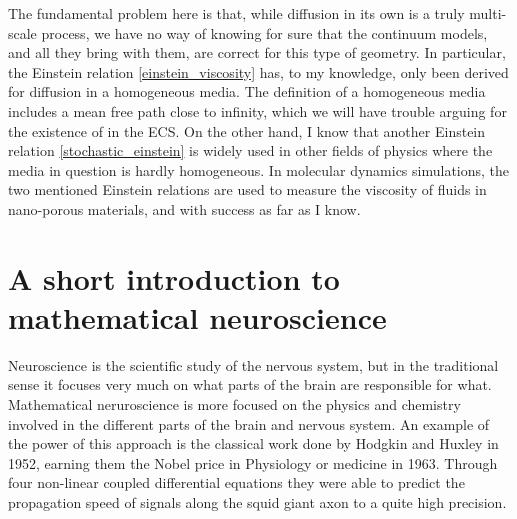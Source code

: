 The fundamental problem here is that, while diffusion in its own is a truly multi-scale process, we have no way of knowing for sure that the continuum models, and all they bring with them, are correct for this type of geometry. 
In particular, the Einstein relation \ref{einstein_viscosity} has, to my knowledge, only been derived for diffusion in a homogeneous media. 
The definition of a homogeneous media includes a mean free path close to infinity, which we will have trouble arguing for the existence of in the ECS. 
On the other hand, I know that another Einstein relation \ref{stochastic_einstein} is widely used  in other fields of physics where the media in question is hardly homogeneous. 
In molecular dynamics simulations, the two mentioned Einstein relations are used to measure the viscosity of fluids in nano-porous materials, and with success as far as I know.

\section{A short introduction to mathematical neuroscience}

Neuroscience is the scientific study of the nervous system, but in the traditional sense it focuses very much on what parts of the brain are responsible for what. 
Mathematical neruroscience is more focused on the physics and chemistry involved in the different parts of the brain and nervous system. 
An example of the power of this approach is the classical work done by Hodgkin and Huxley in 1952, earning them the Nobel price in Physiology or medicine in 1963. 
Through four non-linear coupled differential equations they were able to predict the propagation speed of signals along the squid giant axon to a quite high precision. \\


